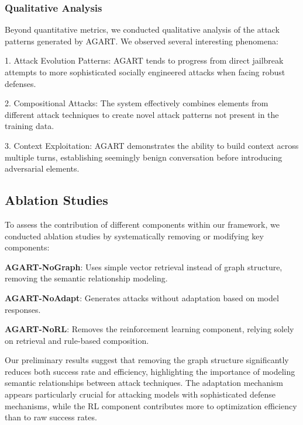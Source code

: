 \subsubsection{Qualitative Analysis}
Beyond quantitative metrics, we conducted qualitative analysis of the attack patterns generated by AGART. We observed several interesting phenomena:

1. Attack Evolution Patterns: AGART tends to progress from direct jailbreak attempts to more sophisticated socially engineered attacks when facing robust defenses.

2. Compositional Attacks: The system effectively combines elements from different attack techniques to create novel attack patterns not present in the training data.

3. Context Exploitation: AGART demonstrates the ability to build context across multiple turns, establishing seemingly benign conversation before introducing adversarial elements.

\subsection{Ablation Studies}
To assess the contribution of different components within our framework, we conducted ablation studies by systematically removing or modifying key components:

\textbf{AGART-NoGraph}: Uses simple vector retrieval instead of graph structure, removing the semantic relationship modeling.

\textbf{AGART-NoAdapt}: Generates attacks without adaptation based on model responses.

\textbf{AGART-NoRL}: Removes the reinforcement learning component, relying solely on retrieval and rule-based composition.

Our preliminary results suggest that removing the graph structure significantly reduces both success rate and efficiency, highlighting the importance of modeling semantic relationships between attack techniques. The adaptation mechanism appears particularly crucial for attacking models with sophisticated defense mechanisms, while the RL component contributes more to optimization efficiency than to raw success rates.
